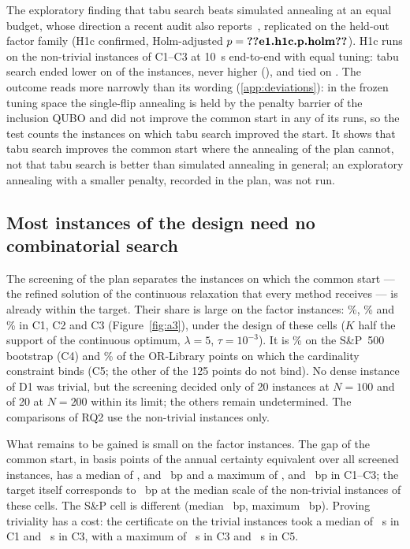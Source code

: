 The exploratory finding that tabu search beats simulated annealing at an equal budget, whose direction a recent audit
also reports~\cite{lozano2026where}, replicated on the held-out factor family (H1c confirmed, Holm-adjusted
$p = \res{e1.h1c.p.holm}$). H1c runs on the non-trivial instances of C1--C3 at 10~s end-to-end with equal tuning:
tabu search ended lower on  of the  instances, never higher
(), and tied on . The outcome reads more narrowly than its wording
(\ref{app:deviations}): in the frozen tuning space the single-flip annealing is held by the penalty barrier of the
inclusion QUBO and did not improve the common start in any of its runs, so the test counts the instances on which
tabu search improved the start. It shows that tabu search improves the common start where the annealing of the plan
cannot, not that tabu search is better than simulated annealing in general; an exploratory annealing with a smaller
penalty, recorded in the plan, was not run.

\subsection{Most instances of the design need no combinatorial search}\label{sec:res-a3}

The screening of the plan separates the instances on which the common start --- the refined solution of the
continuous relaxation that every method receives --- is already within the target. Their share is large on the
factor instances: \%, \% and \% in C1, C2 and C3
(Figure~\ref{fig:a3}), under the design of these cells ($K$ half the support of the continuous optimum,
$\lambda = 5$, $\tau = 10^{-3}$). It is \% on the S\&P~500 bootstrap (C4) and \%
of the  OR-Library points on which the cardinality constraint binds (C5; the other
 of the 125 points do not bind). No dense instance of D1 was trivial, but the screening
decided only  of 20 instances at $N = 100$ and  of 20 at
$N = 200$ within its limit; the others remain undetermined. The comparisons of RQ2 use the non-trivial instances only.

What remains to be gained is small on the factor instances. The gap of the common start, in basis points of the
annual certainty equivalent over all screened instances, has a median of ,
 and ~bp and a maximum of
,  and ~bp in C1--C3; the target
itself corresponds to ~bp at the median scale of the non-trivial instances of these cells. The S\&P cell is different (median
~bp, maximum ~bp). Proving triviality has a cost: the
certificate on the trivial instances took a median of ~s in C1 and
~s in C3, with a maximum of ~s in C3 and
~s in C5.

